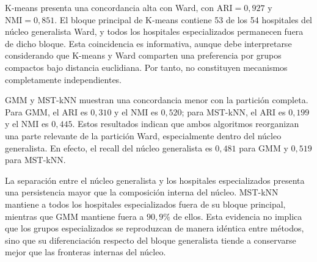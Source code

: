 \begin{table}[htbp]
\centering
\caption{Concordancia cuantitativa entre la partición Ward $K=4$ y particiones alternativas.}
\label{tab:concordancia-sensibilidad}
\end{table}

K-means presenta una concordancia alta con Ward, con $\text{ARI}=0{,}927$ y $\text{NMI}=0{,}851$. El bloque principal de K-means contiene 53 de los 54 hospitales del núcleo generalista Ward, y todos los hospitales especializados permanecen fuera de dicho bloque. Esta coincidencia es informativa, aunque debe interpretarse considerando que K-means y Ward comparten una preferencia por grupos compactos bajo distancia euclidiana. Por tanto, no constituyen mecanismos completamente independientes.

GMM y MST-kNN muestran una concordancia menor con la partición completa. Para GMM, el ARI es $0{,}310$ y el NMI es $0{,}520$; para MST-kNN, el ARI es $0{,}199$ y el NMI es $0{,}445$. Estos resultados indican que ambos algoritmos reorganizan una parte relevante de la partición Ward, especialmente dentro del núcleo generalista. En efecto, el recall del núcleo generalista es $0{,}481$ para GMM y $0{,}519$ para MST-kNN.

La separación entre el núcleo generalista y los hospitales especializados presenta una persistencia mayor que la composición interna del núcleo. MST-kNN mantiene a todos los hospitales especializados fuera de su bloque principal, mientras que GMM mantiene fuera a $90{,}9\%$ de ellos. Esta evidencia no implica que los grupos especializados se reproduzcan de manera idéntica entre métodos, sino que su diferenciación respecto del bloque generalista tiende a conservarse mejor que las fronteras internas del núcleo.

